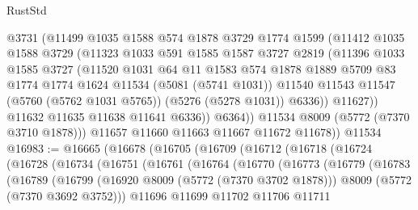\begin{lexlean}{RustStd}
\begin{coremodule}
{\begin{coremodule}
{{{{{{{{{{{{{{{{{{{{{{{{{{{{{                @3731
                (@11499
                  @1035
                  @1588
                  @574
                  @1878
                  @3729
                  @1774
                  @1599
                  (@11412
                    @1035
                    @1588
                    @3729
                    (@11323
                      @1033
                      @591
                      @1585
                      @1587
                      @3727
                      @2819
                      (@11396
                        @1033
                        @1585
                        @3727
                        (@11520
                          @1031
                          @64
                          @11
                          @1583
                          @574
                          @1878
                          @1889
                          @5709
                          @83
                          @1774
                          @1774
                          @1624
                          @11534
                          (@5081 (@5741 @1031))
                          @11540
                          @11543
                          @11547
                          (@5760 (@5762 @1031 @5765))
                          (@5276 (@5278 @1031))
                          @6336))
                      @11627))
                  @11632
                  @11635
                  @11638
                  @11641
                  @6336))
              @6364))
          @11534
          @8009
          (@5772 (@7370 @3710 @1878)))
        @11657
        @11660
        @11663
        @11667
        @11672
        @11678))
    @11534
@16983 := @16665
    (@16678
      (@16705
        (@16709
          (@16712
            (@16718
              (@16724
                (@16728
                  (@16734
                    (@16751
                      (@16761
                        (@16764
                          (@16770
                            (@16773
                              (@16779
                                (@16783
                                  (@16789
                                    (@16799
                                      (@16920 @8009 (@5772 (@7370 @3702 @1878)))
                                      @8009
                                      (@5772 (@7370 @3692 @3752)))
                                    @11696
                                    @11699
                                    @11702
                                    @11706
                                    @11711
}}}}}}}}}}}}}}}}}}}}}}}}}}}}}
\end{coremodule}}
\end{coremodule}
\end{lexlean}
